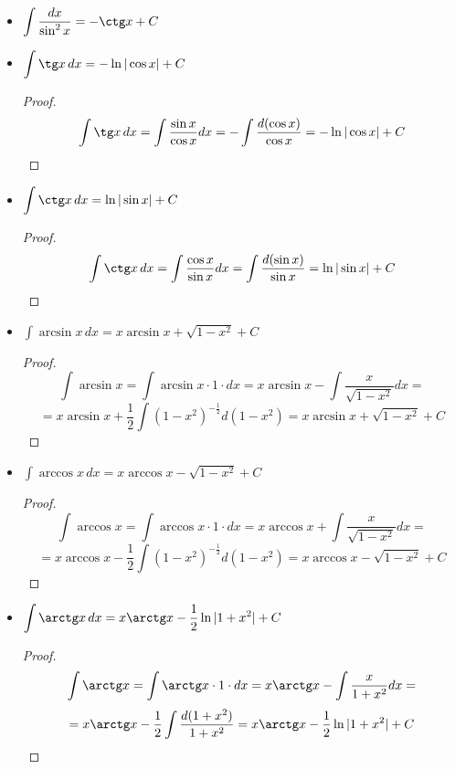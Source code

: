 \begin{itemize}
	\item $\displaystyle \int \frac{dx}{\sin^2 x} = -\ctg x + C$
	
	\item $\displaystyle \int \tg x\,dx = -\ln |\cos x| + C$
	\begin{proof}
	\begin{equation*}
	\int \tg x\,dx =
	\int \frac{\sin x}{\cos x} dx =
	-\int \frac{d(\cos x)}{\cos x} =
	-\ln |\cos x| + C
	\end{equation*}
	\end{proof}
	
	\item $\displaystyle \int \ctg x\,dx = \ln |\sin x| + C$
	\begin{proof}
	\begin{equation*}
	\int \ctg x\,dx =
	\int \frac{\cos x}{\sin x} dx =
	\int \frac{d(\sin x)}{\sin x} =
	\ln |\sin x| + C
	\end{equation*}
	\end{proof}
	
	\item $\displaystyle \int \arcsin x\,dx = x \arcsin x + \sqrt{1 - x^2} + C$
	\begin{proof}
	\begin{equation*}
	\int \arcsin x =
	\int \arcsin x \cdot 1 \cdot dx =
	x \arcsin x - \int \frac{x}{\sqrt{1 - x^2}} dx =
	\end{equation*}
	\begin{equation*}
	= x \arcsin x + \frac12 \int (1 - x^2)^{-\tfrac12} d(1 - x^2) =
	x \arcsin x + \sqrt{1 - x^2} + C
	\end{equation*}
	\end{proof}
	
	\item $\displaystyle \int \arccos x\,dx = x \arccos x - \sqrt{1 - x^2} + C$
	\begin{proof}
	\begin{equation*}
	\int \arccos x =
	\int \arccos x \cdot 1 \cdot dx =
	x \arccos x + \int \frac{x}{\sqrt{1 - x^2}} dx =
	\end{equation*}
	\begin{equation*}
	= x \arccos x - \frac12 \int (1 - x^2)^{-\tfrac12} d(1 - x^2) =
	x \arccos x - \sqrt{1 - x^2} + C
	\end{equation*}
	\end{proof}
	
	\item $\displaystyle \int \arctg x\,dx = x \arctg x - \frac12 \ln |1 + x^2| + C$
	\begin{proof}
	\begin{equation*}
	\int \arctg x =
	\int \arctg x \cdot 1 \cdot dx =
	x \arctg x - \int \frac{x}{1 + x^2} dx =
	\end{equation*}
	\begin{equation*}
	= x \arctg x - \frac12 \int \frac{d(1 + x^2)}{1 + x^2} =
	x \arctg x - \frac12 \ln |1 + x^2| + C
	\end{equation*}
	\end{proof}
	

\end{itemize}
